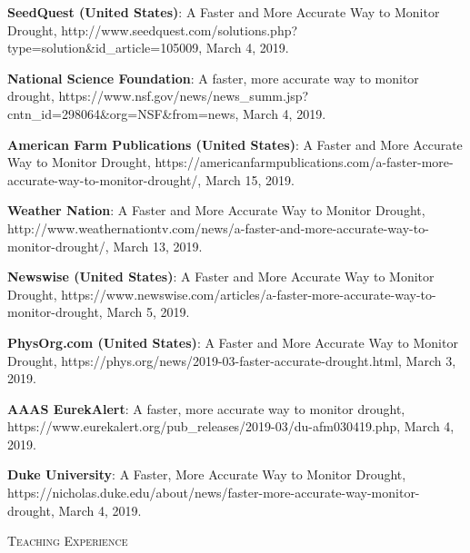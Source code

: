 \documentclass[10pt]{article}
\newenvironment{changemargin}[2]{%
  \begin{list}{}{%
 \setlength{\topsep}{0pt}%
 \setlength{\leftmargin}{#1}%
 \setlength{\rightmargin}{#2}%
 \setlength{\listparindent}{\parindent}%
 \setlength{\itemindent}{\parindent}%
 \setlength{\parsep}{\parskip}%
  }%
  \item[]}{\end{list}
}
\newcommand{\lineover}{
  \begin{changemargin}{-0.05in}{-0.05in}
  \vspace*{-8pt}
  \hrulefill \\
  \vspace*{-2pt}
  \end{changemargin}
}
\newcommand{\header}[1]{
  \begin{changemargin}{-0.5in}{-0.5in}
  \scshape{#1}\\
  \lineover
  \end{changemargin}
}
\newenvironment{body} {
  \vspace*{-2pt}
  \begin{changemargin}{-0.5in}{-0.5in}
}
{\end{changemargin}
}
\begin{document}
\begin{body}
    
  \textbf{SeedQuest (United States)}: A Faster and More Accurate Way to Monitor Drought, http://www.seedquest.com/solutions.php?type=solution\&id\_article=105009, March 4, 2019.\\
  \medskip


    \textbf{National Science Foundation}: A faster, more accurate way to monitor drought, https://www.nsf.gov/news/news\_summ.jsp?cntn\_id=298064\&org=NSF\&from=news, March 4, 2019.\\
    \medskip

  \textbf{American Farm Publications (United States)}: A Faster and More Accurate Way to Monitor Drought, https://americanfarmpublications.com/a-faster-more-accurate-way-to-monitor-drought/, March 15, 2019.\\
  \medskip
  
\textbf{Weather Nation}: A Faster and More Accurate Way to Monitor Drought, http://www.weathernationtv.com/news/a-faster-and-more-accurate-way-to-monitor-drought/, March 13, 2019.\\
  \medskip

  
  
  \textbf{Newswise (United States)}: A Faster and More Accurate Way to Monitor Drought, https://www.newswise.com/articles/a-faster-more-accurate-way-to-monitor-drought, March 5, 2019.\\
  \medskip
  
  \textbf{PhysOrg.com (United States)}: A Faster and More Accurate Way to Monitor Drought, https://phys.org/news/2019-03-faster-accurate-drought.html, March 3, 2019.\\
  \medskip


  \textbf{AAAS EurekAlert}: A faster, more accurate way to monitor drought, https://www.eurekalert.org/pub\_releases/2019-03/du-afm030419.php, March 4, 2019.\\
  \medskip

  \textbf{Duke University}: A Faster, More Accurate Way to Monitor Drought, https://nicholas.duke.edu/about/news/faster-more-accurate-way-monitor-drought, March 4, 2019.\\
  \medskip

\end{body}

\medskip


\header{Teaching Experience}
\end{document}
